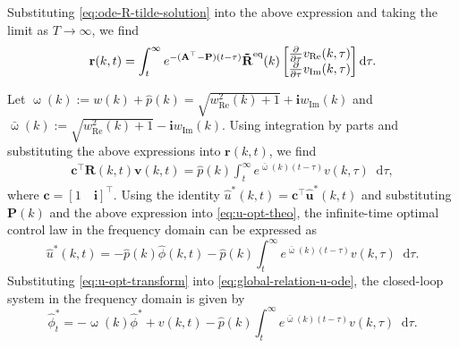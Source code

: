 \documentclass[journal,twoside,web]{ieeecolor}
\newcommand{\state}{\phi}
\newcommand{\statehat}{\hat{\state}}
\newcommand{\im}{\mathbf{i}}
\newcommand*\diff{\mathop{}\!\mathrm{d}}
\newcommand{\wcomplex}{\upomega}
\begin{document}
Substituting \eqref{eq:ode-R-tilde-solution} into the above expression and taking the limit as $T\to\infty$, we find
\begin{equation*}
	\begin{aligned}
		\mathbf{r}(k,t) &= \int_{t}^{\infty}e^{-(\mathbf{A^\top-P})(t-\tau)}\mathbf{\tilde{R}}^{\text{eq}}(k)\begin{bmatrix}\pdv{}{\tau}v_{\text{Re}}(k,\tau)  \\ \pdv{}{\tau}v_{\text{Im}}(k,\tau)\end{bmatrix}\diff\tau. \\
	\end{aligned}
\end{equation*}

Let $\wcomplex(k):=w(k) + \hat{p}(k)=\sqrt{w_{\text{Re}}^2(k) + 1} + \im w_{\text{Im}}(k)$ and $\bar{\wcomplex}(k):=\sqrt{w_{\text{Re}}^2(k) + 1} - \im w_{\text{Im}}(k)$.
Using integration by parts and substituting the above expressions into $\mathbf{r}(k,t)$, we find
\begin{align*}
	\boldsymbol{c}^\top \mathbf{R}(k,t)\boldsymbol{v}(k,t)
	=\hat{p}(k)\int_{t}^{\infty}e^{\bar{\wcomplex}(k)(t-\tau)}v(k,\tau) \diff\tau,
\end{align*}
where $\boldsymbol{c}=[1 \quad \im]^\top$.
Using the identity $\hat{u}^*(k,t)=\boldsymbol{c}^\top\boldsymbol{\hat{u}}^*(k,t)$ and substituting $\mathbf{P}(k)$ and the above expression into \eqref{eq:u-opt-theo}, the infinite-time optimal control law in the frequency domain can be expressed as
\begin{equation}\label{eq:u-opt-transform}
	\hat{u}^*(k,t) = -\hat{p}(k)\statehat(k,t) - \hat{p}(k)\int_{t}^{\infty}e^{\bar{\wcomplex}(k)(t-\tau)}v(k,\tau) \diff\tau.
\end{equation}
Substituting \eqref{eq:u-opt-transform} into \eqref{eq:global-relation-u-ode}, the closed-loop system in the frequency domain is given by 
\begin{equation}\label{eq:global-relation-u-ode-control}
	\statehat_t^* = -\wcomplex(k)\statehat^* + v(k,t) -
	\hat{p}(k)\int_{t}^{\infty}e^{\bar{\wcomplex}(k)(t-\tau)}v(k,\tau) \diff\tau.
\end{equation}
\end{document}
